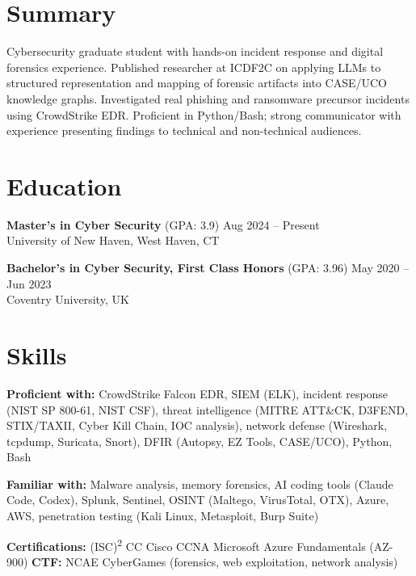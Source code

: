 \documentclass{resume2}
\begin{document}
\makeheader

\section{Summary}
Cybersecurity graduate student with hands-on incident response and digital forensics experience. Published researcher at ICDF2C on applying LLMs to structured representation and mapping of forensic artifacts into CASE/UCO knowledge graphs. Investigated real phishing and ransomware precursor incidents using CrowdStrike EDR. Proficient in Python/Bash; strong communicator with experience presenting findings to technical and non-technical audiences.

\section{Education}

\textbf{Master's in Cyber Security} (GPA: 3.9) \hfill Aug 2024 -- Present\\
University of New Haven, West Haven, CT

\medskip
\textbf{Bachelor's in Cyber Security, First Class Honors} (GPA: 3.96) \hfill May 2020 -- Jun 2023\\
Coventry University, UK

\section{Skills}

\textbf{Proficient with:} CrowdStrike Falcon EDR, SIEM (ELK), incident response (NIST SP 800-61, NIST CSF), threat intelligence (MITRE ATT\&CK, D3FEND, STIX/TAXII, Cyber Kill Chain, IOC analysis), network defense (Wireshark, tcpdump, Suricata, Snort), DFIR (Autopsy, EZ Tools, CASE/UCO), Python, Bash

\smallskip
\textbf{Familiar with:} Malware analysis, memory forensics, AI coding tools (Claude Code, Codex), Splunk, Sentinel, OSINT (Maltego, VirusTotal, OTX), Azure, AWS, penetration testing (Kali Linux, Metasploit, Burp Suite)

\smallskip
\textbf{Certifications:} (ISC)\textsuperscript{2} CC \textbullet{} Cisco CCNA \textbullet{} Microsoft Azure Fundamentals (AZ-900) \quad \textbf{CTF:} NCAE CyberGames (forensics, web exploitation, network analysis)

\end{document}
